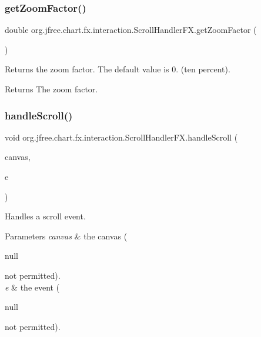 \subsubsection{\texorpdfstring{get\+Zoom\+Factor()}{getZoomFactor()}}
{\footnotesize\ttfamily double org.\+jfree.\+chart.\+fx.\+interaction.\+Scroll\+Handler\+F\+X.\+get\+Zoom\+Factor (\begin{DoxyParamCaption}{ }\end{DoxyParamCaption})}

Returns the zoom factor. The default value is 0. (ten percent).

\begin{DoxyReturn}{Returns}
The zoom factor. 
\end{DoxyReturn}
\mbox{\label{classorg_1_1jfree_1_1chart_1_1fx_1_1interaction_1_1_scroll_handler_f_x_a59413aa0326296008a59e8c477a203ff}} 
\subsubsection{\texorpdfstring{handle\+Scroll()}{handleScroll()}}
{\footnotesize\ttfamily void org.\+jfree.\+chart.\+fx.\+interaction.\+Scroll\+Handler\+F\+X.\+handle\+Scroll (\begin{DoxyParamCaption}\item[{\mbox{\hyperlink{classorg_1_1jfree_1_1chart_1_1fx_1_1_chart_canvas}{Chart\+Canvas}}}]{canvas,  }\item[{Scroll\+Event}]{e }\end{DoxyParamCaption})}

Handles a scroll event.


\begin{DoxyParams}{Parameters}
{\em canvas} & the canvas (
\begin{DoxyCode}
null 
\end{DoxyCode}
 not permitted). \\
\hline
{\em e} & the event (
\begin{DoxyCode}
null 
\end{DoxyCode}
 not permitted). \\
\hline
\end{DoxyParams}


